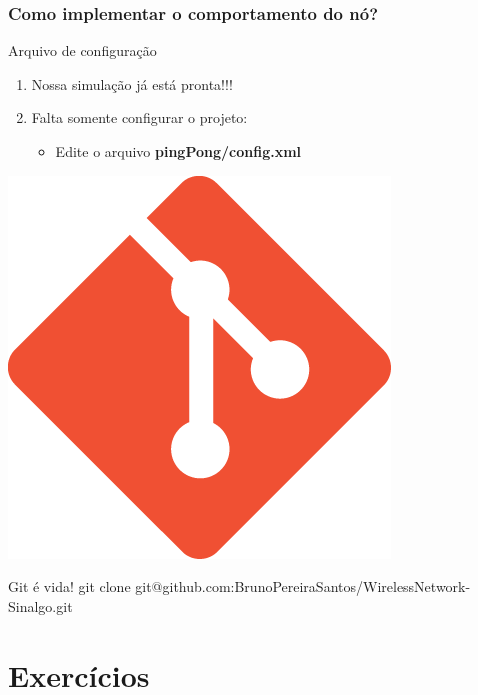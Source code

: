 \documentclass{beamer}
\begin{document}
\begin{frame}
	\frametitle{Como implementar o comportamento do nó?}
	
	\begin{block}{Arquivo de configuração}
		\begin{enumerate}
			\item Nossa simulação já está pronta!!!
			\item Falta somente configurar o projeto:
			\begin{itemize}
				\item Edite o arquivo \textbf{pingPong/config.xml}
			\end{itemize}
		\end{enumerate}
	\end{block}	
	
	
\end{frame}

\begin{frame}
\tiny
	
\end{frame}

\begin{frame}
\footnotesize
\centering

	\includegraphics[width=0.22\linewidth]{img/git.png}
	\begin{exampleblock}{Git é vida!}
		git clone git@github.com:BrunoPereiraSantos/WirelessNetwork-Sinalgo.git
	\end{exampleblock}
	
\end{frame}
\section{Exercícios} %
\end{document}
